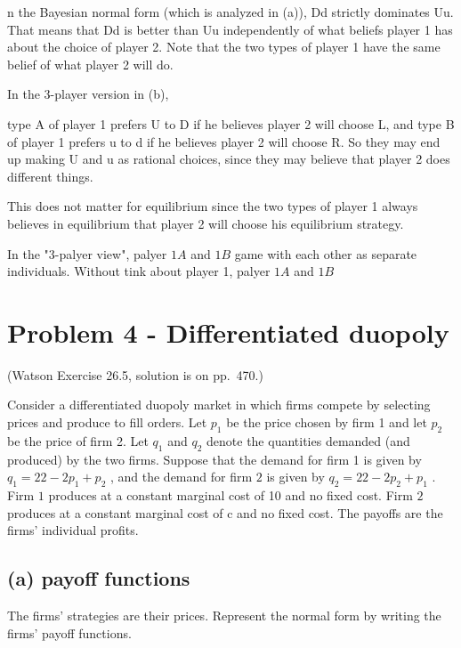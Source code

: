 \documentclass{article}
\begin{document}
n the Bayesian normal form (which is analyzed in (a)), Dd strictly dominates Uu. That means that Dd is better than Uu independently of what beliefs player 1 has about the choice of player 2. Note that the two types of player 1 have the same belief of what player 2 will do.
 
In the 3-player version in (b),

 type A of player 1 prefers U to D if he believes player 2 will choose L, and type B of player 1 prefers u to d if he believes player 2 will choose R. So they may end up making U and u as rational choices, since they may believe that player 2 does different things.
 
This does not matter for equilibrium since the two types of player 1 always believes in equilibrium that player 2 will choose his equilibrium strategy.


In the "3-palyer view", palyer $1A$ and $1B$ game with each other as separate individuals. Without tink about player 1, palyer $1A$ and $1B$ 





\newpage
\section{Problem 4 - Differentiated duopoly}

(Watson Exercise 26.5,  solution is on pp.~470.)

Consider a differentiated duopoly market in which firms compete by selecting
prices and produce to fill orders. Let $p_1$ be the price chosen by firm
1 and let $p_2$ be the price of firm 2. Let $q_1$ and $q_2$ denote the quantities demanded
(and produced) by the two firms. Suppose that the demand for firm
1 is given by $q_1 = 22 − 2p_1 + p_2$ , and the demand for firm $2$ is given by
$q_2 = 22 − 2p_2 + p_1$ . Firm $1$ produces at a constant marginal cost of 10 and
no fixed cost. Firm $2$ produces at a constant marginal cost of c and no fixed
cost. The payoffs are the firms' individual profits.



\subsection*{(a) payoff functions} The firms' strategies are their prices. Represent the normal form by writing the firms' payoff functions.
\end{document}
